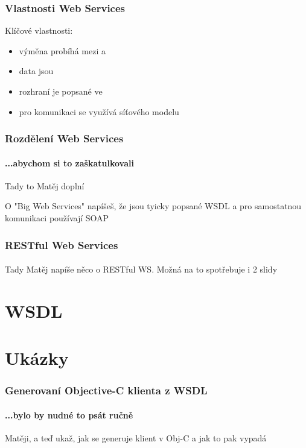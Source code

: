\documentclass[12pt]{beamer}
\begin{document}
\begin{frame}
  \frametitle{Vlastnosti Web Services}

  \begin{block}{Klíčové vlastnosti:}
    \begin{itemize}
      \item výměna probíhá mezi  a 
      \item data jsou 
      \item rozhraní je popsané ve 
      \item pro komunikaci se využívá  síťového modelu
    \end{itemize}
  \end{block}
\end{frame}

\begin{frame}
  \frametitle{Rozdělení Web Services}
  \framesubtitle{...abychom si to zaškatulkovali}

  Tady to Matěj doplní

  O "Big Web Services" napíšeš, že jsou tyicky popsané WSDL a pro samostatnou
  komunikaci používají SOAP
\end{frame}

\begin{frame}
  \frametitle{RESTful Web Services}
  \framesubtitle{}

  Tady Matěj napíše něco o RESTful WS. Možná na to spotřebuje i 2 slidy
\end{frame}

\section{WSDL}

\section{Ukázky}

\begin{frame}
  \frametitle{Generovaní Objective-C klienta z WSDL}
  \framesubtitle{...bylo by nudné to psát ručně}

  \begin{example}
    Matěji, a teď ukaž, jak se generuje klient v Obj-C a jak to pak vypadá
  \end{example}
\end{frame}
\end{document}
